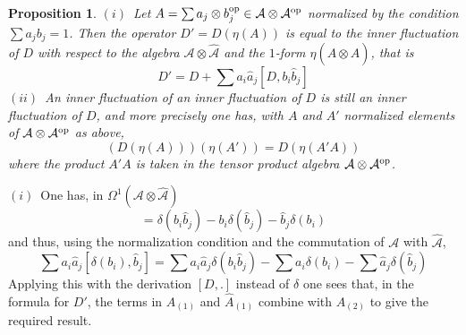 \documentclass[preprint]{revtex4}
\newtheorem{prop}[thm]{Proposition}
\begin{document}
\begin{prop}\label{propinn}
$(i)$~Let $A=\sum a_j\otimes b_j^{\rm op}\in  {\mathcal{A}}\otimes {\mathcal{A}}^{\rm op}$ normalized by the condition $\sum a_jb_j=1$.  Then the operator $D'=D(\eta(A))$ is equal to the inner fluctuation of $D$ with respect to the algebra ${\mathcal{A}}\otimes\hat {\mathcal{A}}$ and the $1$-form $\eta(A\otimes\hat A )$, that is
\begin{equation*}
    D'=D+\sum a_i \hat a_j [D,b_i\hat b_j]
\end{equation*}
$(ii)$~An inner fluctuation of an inner fluctuation of $D$ is still an inner fluctuation of $D$, and more precisely one has, with $A$ and $A'$ normalized elements of ${\mathcal{A}}\otimes {\mathcal{A}}^{\rm op}$ as above,
\begin{equation*}
    \left(D(\eta(A))\right)(\eta(A'))=D(\eta(A'A))
\end{equation*}
where the product $A'A$ is taken in the tensor product algebra ${\mathcal{A}}\otimes {\mathcal{A}}^{\rm op}$.
\end{prop}
\proof $(i)$~One has, in $\Omega^1({\mathcal{A}}\otimes\hat {\mathcal{A}})$
\begin{equation*}
    [\delta(b_i),\hat b_j]=\delta(b_i\hat b_j)-b_i\delta(\hat b_j)-\hat b_j \delta(b_i)
\end{equation*}
and thus, using the normalization condition and the commutation of ${\mathcal{A}}$ with $\hat{\mathcal{A}}$,
\begin{equation*}
    \sum a_i\hat a_j[\delta(b_i),\hat b_j]=\sum a_i \hat a_j \delta(b_i\hat b_j)
    -\sum a_i\delta(b_i)-\sum \hat a_j\delta(\hat b_j)
\end{equation*}
Applying this with the derivation $[D,.]$ instead of $\delta$ one sees that, in the formula for $D'$, the terms in $A_{(1)}$ and $\hat A_{(1)}$ combine with $A_{(2)}$ to give the required result.
\end{document}
